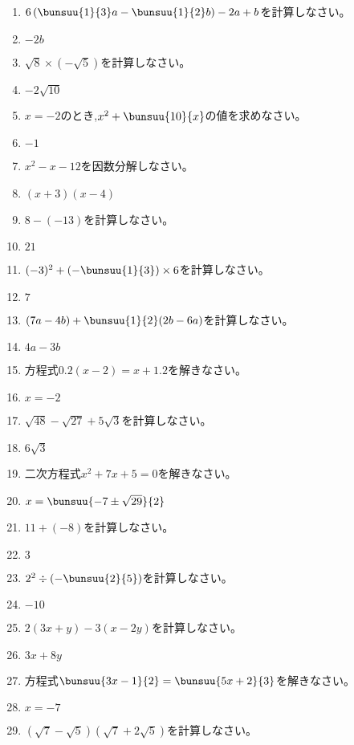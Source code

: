 \documentclass[uplatex,a4j,11pt]{jsreport}
\begin{document}
\begin{multicols}{2}
\begin{enumerate}
    \item $6\left(\bunsuu{1}{3}a-\bunsuu{1}{2}b\right)-2a+b$\quad を計算しなさい。%
    \item $-2b$
    \item $\sqrt{8}\times (-\sqrt{5})$\quad を計算しなさい。%
    \item $-2\sqrt{10}$
    \item $x=-2$\quad のとき,\quad$x^2+\bunsuu{10}{x}$\quad の値を求めなさい。%
    \item $-1$
    \item $x^2-x-12$\quad を因数分解しなさい。%
    \item $(x+3)(x-4)$
    \item $8-(-13)$\quad を計算しなさい。%
    \item $21$
    \item $(-3)^2+\left(-\bunsuu{1}{3}\right)\times6$\quad を計算しなさい。%
    \item $7$
    \item $(7a-4b)+\bunsuu{1}{2}(2b-6a)$\quad を計算しなさい。%
    \item $4a-3b$
    \item 方程式\quad$0.2(x-2)=x+1.2$\quad を解きなさい。%
    \item $x = -2$
    \item $\sqrt{48}-\sqrt{27}+5\sqrt{3}$\quad を計算しなさい。%
    \item $6\sqrt{3}$
    \item 二次方程式\quad$x^2+7x+5=0$\quad を解きなさい。%
    \item $x=\bunsuu{-7\pm\sqrt{29}}{2}$
    \item $11+(-8)$\quad を計算しなさい。%
    \item $3$
    \item $2^2\div \left(-\bunsuu{2}{5}\right)$\quad を計算しなさい。%
    \item $-10$
    \item $2(3x+y)-3(x-2y)$\quad を計算しなさい。%
    \item $3x+8y$
    \item 方程式\quad$\bunsuu{3x-1}{2}=\bunsuu{5x+2}{3}$\quad を解きなさい。%
    \item $x=-7$
    \item $(\sqrt{7}-\sqrt{5})(\sqrt{7}+2\sqrt{5})$\quad を計算しなさい。%

\end{enumerate}
\end{multicols}
\end{document}
